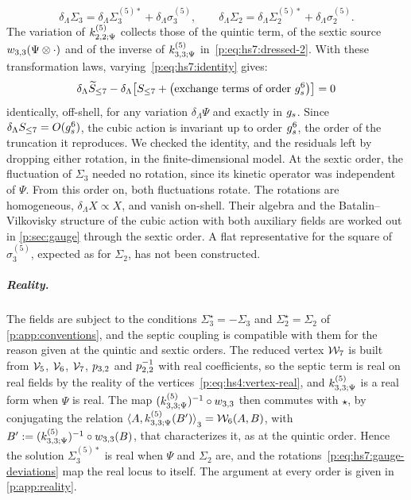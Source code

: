 \begin{equation}
  \label{p:eq:hs7:gauge-fields}
  \delta_\Lambda \Sigma_3
    = \delta_\Lambda \Sigma_3^{(5)*} + \delta_\Lambda \sigma_3^{(5)},
  \qquad
  \delta_\Lambda \Sigma_2
    = \delta_\Lambda \Sigma_2^{(5)*} + \delta_\Lambda \sigma_2^{(5)}.
\end{equation}
The variation of $\kin{2}{\Psi}{5}$ collects those of the quintic term, of the sextic source $\wprod{3}{3}(\Psi \otimes \cdot)$ and of the inverse of $\kin{3}{\Psi}{5}$ in~\eqref{p:eq:hs7:dressed-2}.
With these transformation laws, varying~\eqref{p:eq:hs7:identity} gives:
\begin{equation}
  \label{p:eq:hs7:delta-S-equal}
  \delta_\Lambda \caction[\le 7] - \delta_\Lambda \big[ S_{\le 7} + \big( \text{exchange terms of order } \gs^6 \big) \big]
    = 0
\end{equation}
identically, off-shell, for any variation $\delta_\Lambda \Psi$ and exactly in $\gs$.
Since $\delta_\Lambda S_{\le 7} = O(\gs^6)$, the cubic action is invariant up to order $\gs^6$, the order of the truncation it reproduces.
We checked the identity, and the residuals left by dropping either rotation, in the finite-dimensional model.
At the sextic order, the fluctuation of $\Sigma_3$ needed no rotation, since its kinetic operator was independent of $\Psi$.
From this order on, both fluctuations rotate.
The rotations are homogeneous, $\delta_\Lambda X \propto X$, and vanish on-shell.
Their algebra and the Batalin--Vilkovisky structure of the cubic action with both auxiliary fields are worked out in \cref{p:sec:gauge} through the sextic order.
A flat representative for the square of $\sigma_3^{(5)}$, expected as for $\Sigma_2$, has not been constructed.

\subparagraph{Reality.}

The fields are subject to the conditions $\Sigma_3^\star = - \Sigma_3$ and $\Sigma_2^\star = \Sigma_2$ of \cref{p:app:conventions}, and the septic coupling is compatible with them for the reason given at the quintic and sextic orders.
The reduced vertex $\dvertex{7}$ is built from $\vertex{5}$, $\vertex{6}$, $\vertex{7}$, $\sprod{3}{2}$ and $\sprod{2}{2}^{-1}$ with real coefficients, so the septic term is real on real fields by the reality of the vertices~\eqref{p:eq:hs4:vertex-real}, and $\kin{3}{\Psi}{5}$ is a real form when $\Psi$ is real.
The map $(\kin{3}{\Psi}{5})^{-1} \circ \wprod{3}{3}$ then commutes with $\star$, by conjugating the relation $\pair[3]{A}{\kin{3}{\Psi}{5}(B')} = \dvertex{6}(A, B)$, with $B' := (\kin{3}{\Psi}{5})^{-1} \circ \wprod{3}{3}(B)$, that characterizes it, as at the quintic order.
Hence the solution $\Sigma_3^{(5)*}$ is real when $\Psi$ and $\Sigma_2$ are, and the rotations~\eqref{p:eq:hs7:gauge-deviations} map the real locus to itself.
The argument at every order is given in \cref{p:app:reality}.
